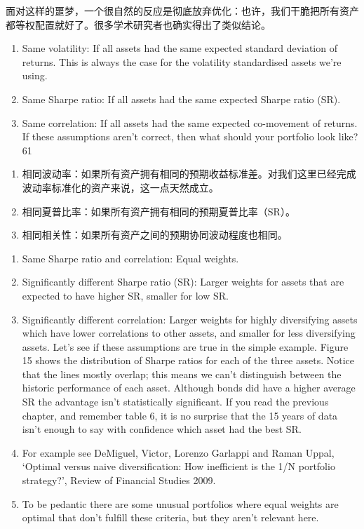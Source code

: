 \begin{chineseblock}面对这样的噩梦，一个很自然的反应是彻底放弃优化：也许，我们干脆把所有资产都等权配置就好了。很多学术研究者也确实得出了类似结论。\end{chineseblock}


\begin{enumerate}
\item Same volatility: If all assets had the same expected standard deviation of returns. This is always the case for the volatility standardised assets we're using.
\item Same Sharpe ratio: If all assets had the same expected Sharpe ratio (SR).
\item Same correlation: If all assets had the same expected co-movement of returns. If these assumptions aren't correct, then what should your portfolio look like?61 \end{enumerate}

\begin{enumerate}
\item 相同波动率：如果所有资产拥有相同的预期收益标准差。对我们这里已经完成波动率标准化的资产来说，这一点天然成立。
\item 相同夏普比率：如果所有资产拥有相同的预期夏普比率（SR）。
\item 相同相关性：如果所有资产之间的预期协同波动程度也相同。\end{enumerate}

\begin{enumerate}
\item Same Sharpe ratio and correlation: Equal weights.
\item Significantly different Sharpe ratio (SR): Larger weights for assets that are expected to have higher SR, smaller for low SR.
\item Significantly different correlation: Larger weights for highly diversifying assets which have lower correlations to other assets, and smaller for less diversifying assets. Let's see if these assumptions are true in the simple example. Figure 15 shows the distribution of Sharpe ratios for each of the three assets. Notice that the lines mostly overlap; this means we can't distinguish between the historic performance of each asset. Although bonds did have a higher average SR the advantage isn't statistically significant. If you read the previous chapter, and remember table 6, it is no surprise that the 15 years of data isn't enough to say with confidence which asset had the best SR.
\item For example see DeMiguel, Victor, Lorenzo Garlappi and Raman Uppal, ‘Optimal versus naive diversification: How inefficient is the 1/N portfolio strategy?', Review of Financial Studies 2009.
\item To be pedantic there are some unusual portfolios where equal weights are optimal that don't fulfill these criteria, but they aren't relevant here. \end{enumerate}

